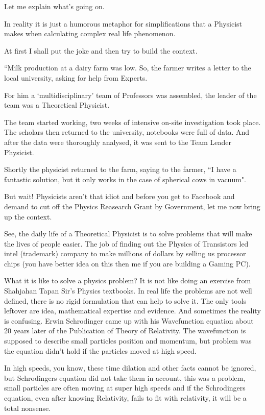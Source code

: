 \documentclass[12pt,a4paper,darkblue]{memoir}
\begin{document}
Let me explain what's going on.

In reality it is just a humorous metaphor for simplifications that a Physicist makes when calculating complex real life phenomenon. 

At first I shall put the joke and then try to build the context.

``Milk production at a dairy farm was low. So, the farmer writes a letter to the local university, asking for help from Experts. 

For him a `multidisciplinary' team of Professors was assembled, the leader of the team was a Theoretical Physicist. 

The team started working, two weeks of intensive on-site investigation took place. The scholars then returned to the university, notebooks were full of data. And after the data were thoroughly analysed, it was sent to the Team Leader Physicist. 

Shortly the physicist returned to the farm, saying to the farmer, ``I have a fantastic solution, but it only works in the case of spherical cows in vacuum".



But wait! Physicists aren't that idiot and before you get to Facebook and demand to cut off the Physics Reasearch Grant by Government, let me now bring up the context. 

See, the daily life of a Theoretical Physicist is to solve problems that will make the lives of people easier. The job of finding out the Physics of Transistors led intel (trademark) company to make millions of dollars by selling us processor chips (you have better idea on this then me if you are building a Gaming PC). 


What it is like to solve a physics problem? It is not like doing an exercise from Shahjahan Tapan Sir's Physics textbooks. In real life the problems are not well defined, there is no rigid formulation that can help to solve it. The only tools leftover are idea, mathematical expertise and evidence. And sometimes the reality is confusing. Erwin Schrodinger came up with his Wavefunction equation about 20 years later of the Publication of Theory of Relativity. The wavefunction is supposed to describe small particles position and momentum, but problem was the equation didn't hold if the particles moved at high speed. 

In high speeds, you know, these time dilation and other facts cannot be ignored, but Schrodingers equation did not take them in account, this was a problem, small particles are often moving at super high speeds and if the Schrodingers equation, even after knowing Relativity, fails to fit with relativity, it will be a total nonsense.
\end{document}
